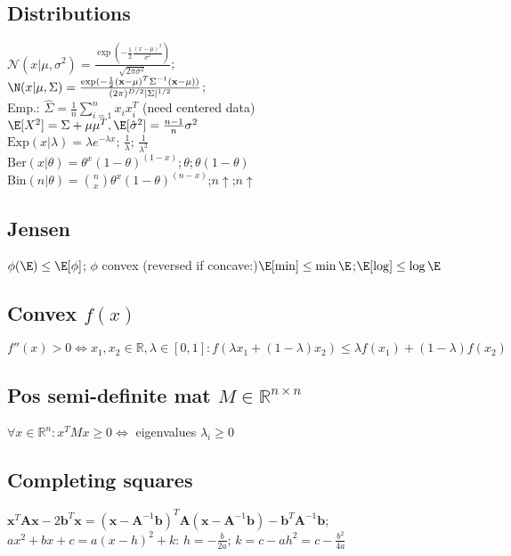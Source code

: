 \subsection*{Distributions}
$\mathcal{N}(x|\mu, \sigma^2)=\frac{\exp(-\frac{1}{2}\frac{(x-\mu)^2}{\sigma^2})}{\sqrt{2\pi\sigma^2}}$;\\
$\N(x|\mu, \Sigma)= \frac{\exp(-\frac{1}{2}(\mathbf{x}-\mu)^T\Sigma^{-1}(\mathbf{x}-\mu))}{(2\pi)^{D/2}|\Sigma|^{1/2}}$;\\
Emp.: $\hat{\Sigma} = \frac{1}{n}\sum_{i=1}^n x_i x_i^T$ (need centered data)\\
$\E[X^2]= \Sigma+ \mu\mu^T, \E[\hat{\sigma}^2]=\frac{n-1}{n}\sigma^2 $\\
$\mathrm{Exp}(x|\lambda){=}\lambda e^{-\lambda x}; \, \frac{1}{\lambda}; \, \frac{1}{\lambda^2}$\\
$\mathrm{Ber}(x|\theta){=}\theta^x (1{-}\theta)^{(1-x)}$;$ \, \theta$;$ \, \theta(1-\theta)$\\
$\mathrm{Bin}(n|\theta)=\binom{n}{x}\theta^{x}(1-\theta)^{(n-x)}$;$n\uparrow$;$n\uparrow$
\subsection*{Jensen}
$\phi(\E)\leq \E[\phi]$; $\phi$ convex (reversed if concave:)$\E[\min]\leq \min\E$;$\E[\log]\leq\log\E$
\subsection*{Convex $f(x)$}
$f''(x) > 0 \Leftrightarrow x_1,x_2 \in \mathbb{R}, \lambda \in [0,1]:
f(\lambda x_1 + (1-\lambda) x_2) \leq \lambda f(x_1) + (1-\lambda) f(x_2)$

\subsection*{Pos semi-definite mat $M \in \mathbb{R}^{n\times n}$}
$\forall x \in \mathbb{R}^n: x^TMx \geq 0 \Leftrightarrow$ eigenvalues $\lambda_i\geq 0$
\subsection*{Completing squares}
$\mathbf{x}^T\mathbf{A}\mathbf{x}-2\mathbf{b}^T\mathbf{x} = (\mathbf{x}-\mathbf{A}^{-1}\mathbf{b})^T\mathbf{A}(\mathbf{x}-\mathbf{A}^{-1}\mathbf{b})-\mathbf{b}^T\mathbf{A}^{-1}\mathbf{b}$;\\
$ax^{2}+bx+c=a(x-h)^{2}+k$: $h=-{\frac {b}{2a}}$; $k=c-ah^{2}=c-{\frac {b^{2}}{4a}}$

